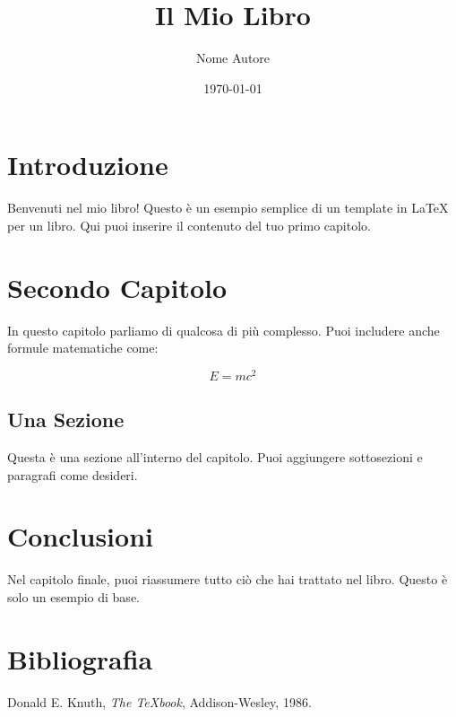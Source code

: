\documentclass[12pt]{book}
\begin{document}
\title{Il Mio Libro}
\author{Nome Autore}
\date{\today}
\maketitle  %

\tableofcontents
\newpage

\chapter{Introduzione}
Benvenuti nel mio libro! Questo è un esempio semplice di un template in LaTeX per un libro. Qui puoi inserire il contenuto del tuo primo capitolo.

\chapter{Secondo Capitolo}
In questo capitolo parliamo di qualcosa di più complesso. Puoi includere anche formule matematiche come:

\begin{equation}
E = mc^2
\end{equation}

\section{Una Sezione}
Questa è una sezione all'interno del capitolo. Puoi aggiungere sottosezioni e paragrafi come desideri.

\chapter{Conclusioni}
Nel capitolo finale, puoi riassumere tutto ciò che hai trattato nel libro. Questo è solo un esempio di base.

\newpage
\chapter*{Bibliografia}
\begin{thebibliography}{9}
 Donald E. Knuth, \textit{The TeXbook}, Addison-Wesley, 1986.
\end{thebibliography}
\end{document}
